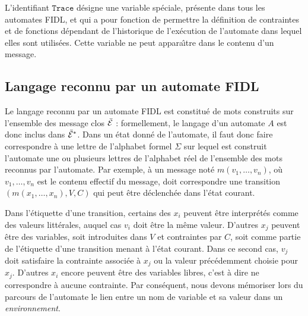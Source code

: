 L'identifiant $\mathtt{Trace}$ d\'esigne une variable sp\'eciale,
pr\'esente dans tous les automates \textsf{FIDL}, et qui a pour
fonction de permettre la d\'efinition de contraintes et de fonctions
d\'ependant de l'historique de l'ex\'ecution de l'automate dans
lequel elles sont utilis\'ees. Cette variable ne peut appara\^{\i}tre
dans le contenu d'un message. 

\subsection{Langage reconnu par un automate \textsf{FIDL}}
\label{section-reco}

Le langage reconnu par un automate \textsf{FIDL} est
constitu\'e de mots  construits
sur l'ensemble des message clos $\bar{\cal E}$ : formellement, le
langage d'un automate $A$ est donc inclus dans $\bar{\cal E}^*$. 
 Dans un \'etat donn\'e de l'automate, il faut donc faire
correspondre \`a une lettre de l'alphabet formel $\Sigma$ sur lequel est
construit l'automate
une ou plusieurs lettres de l'alphabet r\'eel de l'ensemble des
mots reconnus par l'automate. Par exemple, \`a un message
not\'e $m(v_1,\dots,v_n)$,
o\`u $v_1,\dots,v_n$ est le contenu 
effectif du message, doit correspondre une transition
$(m(x_1,\dots,x_n),V,C)$ qui peut \^etre d\'eclench\'ee  dans
l'\'etat courant.

Dans l'\'etiquette d'une transition, certains des $x_i$ peuvent \^etre
interpr\'et\'es comme des valeurs litt\'erales, auquel cas $v_i$ doit \^etre la m\^eme valeur.
D'autres $x_j$ peuvent \^etre des variables, soit introduites dans $V$ et
contraintes par $C$, soit comme partie de l'\'etiquette d'une
transition menant \`a l'\'etat courant. Dans ce second cas, $v_j$ doit satisfaire la
contrainte associ\'ee \`a $x_j$ ou la valeur pr\'ec\'edemment \og choisie\fg
pour $x_j$. D'autres $x_i$ encore peuvent \^etre des variables
libres, c'est \`a dire ne correspondre \`a aucune contrainte.
Par cons\'equent, nous devons m\'emoriser lors du parcours de l'automate
le lien entre un nom de variable et sa valeur dans un
\emph{environnement}.

